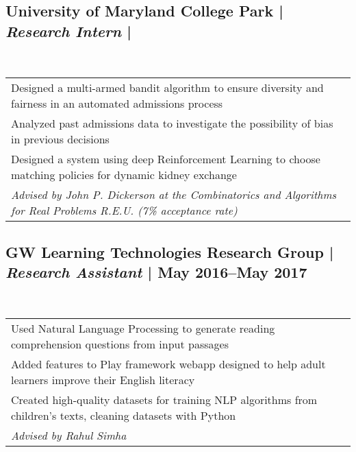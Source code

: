 \documentclass[a4paper,10pt]{article}
\begin{document}
\subsection{University of Maryland College Park | \emph{Research Intern} |  }
~\begin{tabular}{@{~$\bullet$~~}l}
Designed a multi-armed bandit algorithm to ensure diversity and fairness in an automated admissions process\\
Analyzed past admissions data to investigate the possibility of bias in previous decisions \\
Designed a system using deep Reinforcement Learning to choose matching policies for dynamic kidney exchange \\
\textit{Advised by John P. Dickerson at the Combinatorics and Algorithms for Real Problems R.E.U. (7\% acceptance rate)}\\
\end{tabular}

\subsection{GW Learning Technologies Research Group | \emph{Research Assistant} |  May 2016--May 2017 }
~\begin{tabular}{@{~$\bullet$~~}l}
Used Natural Language Processing to generate reading comprehension questions from input passages\\
Added features to Play framework webapp designed to help adult learners improve their English literacy\\
Created high-quality datasets for training NLP algorithms from children's texts, cleaning datasets with Python\\
\textit{Advised by Rahul Simha}\\
\end{tabular}
\end{document}
